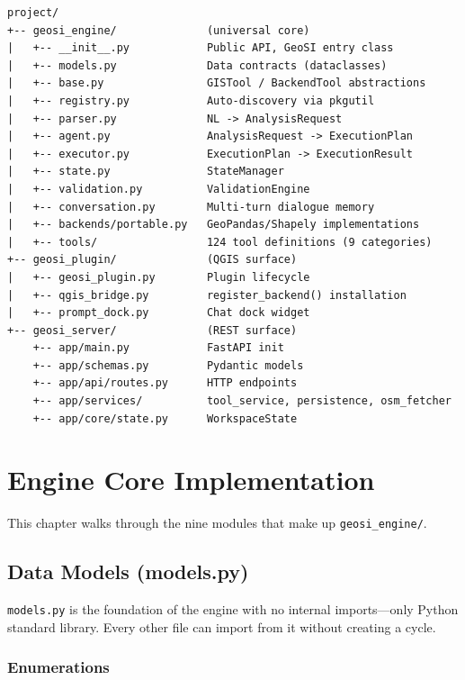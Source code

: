 \documentclass[12pt,a4paper]{report}
\begin{document}
\begin{lstlisting}[language={}]
project/
+-- geosi_engine/              (universal core)
|   +-- __init__.py            Public API, GeoSI entry class
|   +-- models.py              Data contracts (dataclasses)
|   +-- base.py                GISTool / BackendTool abstractions
|   +-- registry.py            Auto-discovery via pkgutil
|   +-- parser.py              NL -> AnalysisRequest
|   +-- agent.py               AnalysisRequest -> ExecutionPlan
|   +-- executor.py            ExecutionPlan -> ExecutionResult
|   +-- state.py               StateManager
|   +-- validation.py          ValidationEngine
|   +-- conversation.py        Multi-turn dialogue memory
|   +-- backends/portable.py   GeoPandas/Shapely implementations
|   +-- tools/                 124 tool definitions (9 categories)
+-- geosi_plugin/              (QGIS surface)
|   +-- geosi_plugin.py        Plugin lifecycle
|   +-- qgis_bridge.py         register_backend() installation
|   +-- prompt_dock.py         Chat dock widget
+-- geosi_server/              (REST surface)
    +-- app/main.py            FastAPI init
    +-- app/schemas.py         Pydantic models
    +-- app/api/routes.py      HTTP endpoints
    +-- app/services/          tool_service, persistence, osm_fetcher
    +-- app/core/state.py      WorkspaceState
\end{lstlisting}

\chapter{Engine Core Implementation}

This chapter walks through the nine modules that make up \texttt{geosi\_engine/}.

\section{Data Models (models.py)}

\texttt{models.py} is the foundation of the engine with no internal imports---only Python standard library.  Every other file can import from it without creating a cycle.

\subsection{Enumerations}
\end{document}
